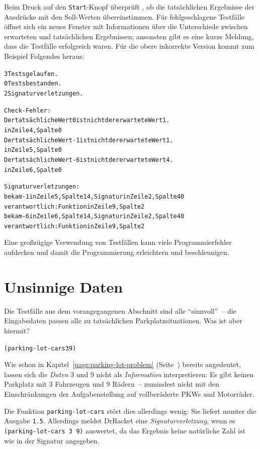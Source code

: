 Beim Druck auf den \texttt{Start}-Knopf überprüft \drscheme{}, ob die
tatsächlichen Ergebnisse der Ausdrücke mit den Soll-Werten
übereinstimmen.  Für fehlgeschlagene Testfälle öffnet sich ein neues Fenster
mit Informationen über die Unterschiede zwischen erwarteten und
tatsächlichen Ergebnissen; ansonsten gibt es eine kurze Meldung, dass die
Testfälle erfolgreich waren.  Für die obere inkorrekte Version kommt
zum Beispiel Folgendes heraus:
%
\begin{alltt}
3 Tests gelaufen.
0 Tests bestanden.
2 Signaturverletzungen.

Check-Fehler:
	Der tatsächliche Wert 0 ist nicht der erwartete Wert 1.
in Zeile 4, Spalte 0 
	Der tatsächliche Wert -1 ist nicht der erwartete Wert 1.
in Zeile 5, Spalte 0 
	Der tatsächliche Wert -6 ist nicht der erwartete Wert 4.
in Zeile 6, Spalte 0 

Signaturverletzungen:
	bekam -1 in Zeile 5, Spalte 14 , Signatur in Zeile 2, Spalte 40 
	verantwortlich: Funktion in Zeile 9, Spalte 2 
	bekam -6 in Zeile 6, Spalte 14 , Signatur in Zeile 2, Spalte 40 
	verantwortlich: Funktion in Zeile 9, Spalte 2 
\end{alltt}
%
Eine großzügige Verwendung
von Testfällen kann viele Programmierfehler
aufdecken und damit die Programmierung erleichtern und beschleunigen.

\begin{mantra}[Testfälle]\label{mantra:test}

\end{mantra}


\section{Unsinnige Daten}
\label{sec:nonsensical-data-prequel}

Die Testfälle aus dem vorangegangenen Abschnitt sind alle
"`sinnvoll"'~-- die Eingabedaten passen alle zu tatsächlichen
Parkplatzsituationen.  Was ist aber hiermit?
%
\begin{alltt}
(parking-lot-cars 3 9)
\end{alltt}
%
Wie schon in Kapitel~\ref{page:parking-lot-problem}
(Seite~\pageref{page:parking-lot-problem}) bereits angedeutet, 
lassen sich die \emph{Daten} 3 und 9 nicht als \emph{Information}
interpretieren: Es gibt keinen Parkplatz mit 3 Fahrzeugen und 9
Rädern~-- zumindest nicht mit den Einschränkungen der Aufgabenstellung
auf vollberäderte PKWs und Motorräder.

Die Funktion \texttt{parking-lot-cars} stört dies allerdings wenig:
Sie liefert munter die Ausgabe \texttt{1.5}.  Allerdings meldet
DrRacket eine \textit{Signaturverletzung},
wenn es \texttt{(parking-lot-cars 3 9)} auswertet, da das Ergebnis
keine natürliche Zahl ist wie in der Signatur angegeben.  

